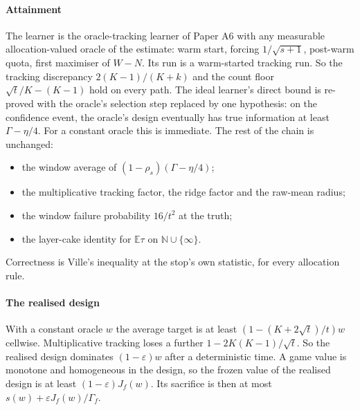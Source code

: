 \paragraph{Attainment} The learner is the oracle-tracking learner of Paper A6 with any
measurable allocation-valued oracle of the estimate: warm start, forcing $1/\sqrt{s+1}$,
post-warm quota, first maximiser of $W-N$. Its run is a warm-started tracking run. So the
tracking discrepancy $2(K-1)/(K+k)$ and the count floor $\sqrt t/K-(K-1)$ hold on every path.
The ideal learner's direct bound is re-proved with the oracle's selection step replaced by one
hypothesis: on the confidence event, the oracle's design eventually has true information at
least $\Gamma-\eta/4$. For a constant oracle this is immediate. The rest of the chain is
unchanged:
\begin{itemize}
\item the window average of $(1-\rho_s)(\Gamma-\eta/4)$;
\item the multiplicative tracking factor, the ridge factor and the raw-mean radius;
\item the window failure probability $16/t^2$ at the truth;
\item the layer-cake identity for $\mathbb E\tau$ on $\mathbb N\cup\{\infty\}$.
\end{itemize}
Correctness is Ville's inequality at the stop's own statistic, for every allocation rule.

\paragraph{The realised design} With a constant oracle $w$ the average target is at least
$(1-(K+2\sqrt t)/t)w$ cellwise. Multiplicative tracking loses a further $1-2K(K-1)/\sqrt t$. So the
realised design dominates $(1-\varepsilon)w$ after a deterministic time. A game value is
monotone and homogeneous in the design, so the frozen value of the realised design is at least
$(1-\varepsilon)J_f(w)$. Its sacrifice is then at most $s(w)+\varepsilon J_f(w)/\Gamma_f$.

